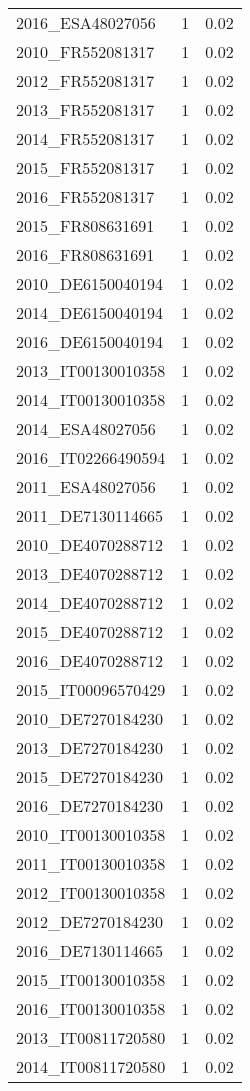\begin{table*}[htbp]
\begin{tabular}{lrr}
2016_ESA48027056 & 1 & 0.02 \\
2010_FR552081317 & 1 & 0.02 \\
2012_FR552081317 & 1 & 0.02 \\
2013_FR552081317 & 1 & 0.02 \\
2014_FR552081317 & 1 & 0.02 \\
2015_FR552081317 & 1 & 0.02 \\
2016_FR552081317 & 1 & 0.02 \\
2015_FR808631691 & 1 & 0.02 \\
2016_FR808631691 & 1 & 0.02 \\
2010_DE6150040194 & 1 & 0.02 \\
2014_DE6150040194 & 1 & 0.02 \\
2016_DE6150040194 & 1 & 0.02 \\
2013_IT00130010358 & 1 & 0.02 \\
2014_IT00130010358 & 1 & 0.02 \\
2014_ESA48027056 & 1 & 0.02 \\
2016_IT02266490594 & 1 & 0.02 \\
2011_ESA48027056 & 1 & 0.02 \\
2011_DE7130114665 & 1 & 0.02 \\
2010_DE4070288712 & 1 & 0.02 \\
2013_DE4070288712 & 1 & 0.02 \\
2014_DE4070288712 & 1 & 0.02 \\
2015_DE4070288712 & 1 & 0.02 \\
2016_DE4070288712 & 1 & 0.02 \\
2015_IT00096570429 & 1 & 0.02 \\
2010_DE7270184230 & 1 & 0.02 \\
2013_DE7270184230 & 1 & 0.02 \\
2015_DE7270184230 & 1 & 0.02 \\
2016_DE7270184230 & 1 & 0.02 \\
2010_IT00130010358 & 1 & 0.02 \\
2011_IT00130010358 & 1 & 0.02 \\
2012_IT00130010358 & 1 & 0.02 \\
2012_DE7270184230 & 1 & 0.02 \\
2016_DE7130114665 & 1 & 0.02 \\
2015_IT00130010358 & 1 & 0.02 \\
2016_IT00130010358 & 1 & 0.02 \\
2013_IT00811720580 & 1 & 0.02 \\
2014_IT00811720580 & 1 & 0.02 \\

\end{tabular}
\end{table*}
